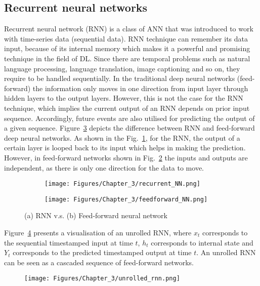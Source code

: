 \subsection{Recurrent neural networks}
\label{sec222}
Recurrent neural network (RNN) is a class of ANN that was introduced to work with time-series data (sequential data).
RNN technique can remember its data input, because of its internal memory which makes it a powerful and promising technique in the field of DL.
Since there are temporal problems such as natural language processing, language translation, image captioning and so on, they require to be handled sequentially.
In the traditional deep neural networks (feed-forward) the information only moves in one direction from input layer through hidden layers to the output layers.
However, this is not the case for the RNN technique, which implies the current output of an RNN depends on prior input sequence.
Accordingly, future events are also utilised for predicting the output of a given sequence.
Figure~\ref{fig:rnn_vs_FFNN} depicts the difference between RNN and feed-forward deep neural networks.
As shown in the Fig.~\ref{fig:rrn}, for the RNN, the output of a certain layer is looped back to its input which helps in making the prediction.
However, in feed-forward networks shown in Fig.~\ref{fig:FFNN} the inputs and outputs are independent, as there is only one direction for the data to move.
\begin{figure}[!ht]
	\centering
	\begin{subfigure}{0.49\textwidth}		
		\centering
		\texttt{[image: Figures/Chapter\_3/recurrent\_NN.png]}
		\caption{} 
		\label{fig:rrn}
	\end{subfigure}
	\hfill
	\begin{subfigure}{0.49\textwidth}
		\centering
		\texttt{[image: Figures/Chapter\_3/feedforward\_NN.png]}
		\caption{} 
		\label{fig:FFNN}
	\end{subfigure}	
	\caption{(a) RNN v.s. (b) Feed-forward neural network}
	\label{fig:rnn_vs_FFNN}
\end{figure}

Figure~\ref{unrolled_rnn} presents a visualisation of an unrolled RNN, where \(x_{t}\) corresponds to the sequential timestamped input at time \(t\), \(h_{t}\) corresponds to internal state  and \(Y_{t}\) corresponds to the predicted timestamped output at time \(t\).
An unrolled RNN can be seen as a cascaded sequence of feed-forward networks.
\begin{figure}
	\begin{center}
	\texttt{[image: Figures/Chapter\_3/unrolled\_rnn.png]}
	\end{center}
	\label{unrolled_rnn}
\end{figure}


